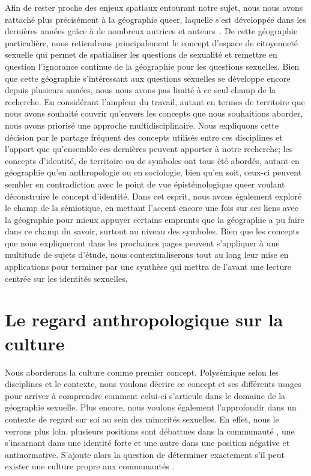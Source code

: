 Afin de rester proche des enjeux spatiaux entourant notre sujet, nous nous avons rattaché plus précisément à la géographie queer, laquelle s'est développée dans les dernières années grâce à de nombreux autrices et auteurs~\citep[sans être exhaustif, nous pouvons citer][]{Bell1995,Bell2004,Bell1995b,Bell1995a,Bell1991,Brown2003,Knopp2004,Knopp1992,Knopp1990,Knopp2003,Lauria1985,Oswin2006,Oswin2004}.
De cette géographie particulière, nous retiendrons principalement le concept d'espace de citoyenneté sexuelle qui permet de spatialiser les questions de sexualité et remettre en question l'ignorance continue de la géographie pour les questions sexuelles.
Bien que cette géographie s'intéressant aux questions sexuelles se développe encore depuis plusieurs années, nous nous avons pas limité à ce seul champ de la recherche.
En considérant l'ampleur du travail, autant en termes de territoire que nous avons souhaité couvrir qu'envers les concepts que nous souhaitions aborder, nous avons priorisé une approche multidisciplinaire.
Nous expliquons cette décision par le partage fréquent des concepts utilisés entre ces disciplines et l'apport que qu'ensemble ces dernières peuvent apporter à notre recherche; les concepts d'identité, de territoire ou de symboles ont tous été abordés, autant en géographie qu'en anthropologie ou en sociologie, bien qu'en soit, ceux-ci peuvent sembler en contradiction avec le point de vue épistémologique queer voulant déconstruire le concept d'identité.
Dans cet esprit, nous avons également exploré le champ de la sémiotique, en mettant l'accent encore une fois sur ses liens avec la géographie pour mieux appuyer certains emprunts que la géographie a pu faire dans ce champ du savoir, surtout au niveau des symboles.
Bien que les concepts que nous expliqueront dans les prochaines pages peuvent s'appliquer à une multitude de sujets d'étude, nous contextualiserons tout au long leur mise en applications pour terminer par une synthèse qui mettra de l'avant une lecture centrée sur les identités sexuelles.

\section{Le regard anthropologique sur la culture}
\label{sec:le_regard_anthropologique_sur_la_culture}

Nous aborderons la culture comme premier concept.
Polysémique selon les disciplines et le contexte, nous voulons décrire ce concept et ses différents usages pour arriver à comprendre comment celui-ci s'articule dans le domaine de la géographie sexuelle.
Plus encore, nous voulons également l'approfondir dans un contexte de regard sur soi au sein des minorités sexuelles.
En effet, nous le verrons plus loin, plusieurs positions sont débattues dans la communauté \lgbt{}, une s'incarnant dans une identité forte et une autre dans une position négative et antinormative.
S'ajoute alors la question de déterminer exactement s'il peut exister une culture propre aux communautés \lgbt{}.

